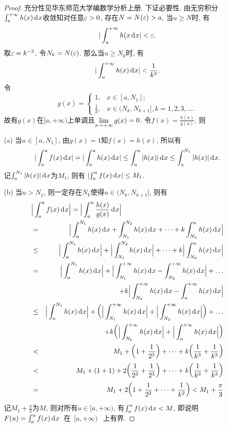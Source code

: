 \documentclass[a4paper,12pt,twoside]{ctexart}
\begin{document}
\begin{proof}
    充分性见华东师范大学编数学分析上册. 下证必要性.
    由无穷积分$\int_{a}^{+\infty}{h(x){\,\textup{d}}^{}x}$收敛知对任意$\varepsilon>0$, 存在$N=N(\varepsilon)>a$, 当$u\ge N$时, 有
        $$\vert\int_u^{+\infty}h(x{\,\textup{d}}^{}x\vert<\varepsilon.$$
    取$\varepsilon=k^{-3}$, 令$N_k=N(\varepsilon)$.  那么当$u\ge N_k$时, 有
        $$\vert\int_u^{+\infty}h(x){\,\textup{d}}^{}x\vert<\frac{1}{k^3}.$$
    令
$$
g(x)=\begin{cases}
    1,&x\in[a, N_1];\\
    \frac{1}{k},&x\in(N_k, N_{k+1}], k=1,2,3,\dots.
    \end{cases}
$$
故有$g(x)$在$[a, +\infty)$上单调且$\displaystyle\lim_{x\to+\infty}g(x)=0$. 令$f(x)=\frac{h(x)}{g(x)}$, 则

    (a) 当$u\in[a, N_1]$, 由$g(x)=1$知$f(x)=h(x)$, 所以有
    $$\vert\int_{a}^{u}{f(x){\,\textup{d}}^{}x}\vert=\vert\int_{a}^{u}{h(x){\,\textup{d}}^{}x}\vert \le\int_{a}^{u}\vert{h(x)}\vert{\,\textup{d}}^{}x\le\int_{a}^{N_1}\vert h(x)\vert{\,\textup{d}}^{}x.$$
    记$\int_{a}^{N_1}\vert h(x)\vert{\,\textup{d}}^{}x$为$ M_1$, 则有 ${\vert{\int_{a}^{u}{f(x){\,\textup{d}}^{}x}}\vert}\leq M_1$.

    (b) 当$u>N_1$, 则一定存在${N_k}$使得$u\in(N_k, N_{k+1}]$, 则有\setcolsep
\begin{eqnarray*}
\lefteqn{\Big\vert\int_a^uf(x)\dx\Big\vert
    =\Big\vert\int_{a}^{u}\frac{h(x)}{g(x)}\dx\Big\vert}\\
    &=&\Big\vert\int_{a}^{N_1}h(x)\dx+ \int_{N_1}^{N_2}h(x)\dx+\dots+k\int_{N_k}^uh(x)\dx\Big\vert\\
    &\le&\Big\vert\int_{a}^{N_1}h(x)\dx\Big\vert +\Big\vert\int_{N_1}^{N_2}h(x)\dx\Big\vert+\dots+ k\Big\vert\int_{N_k}^{u}h(x)\dx\Big\vert\\
    &=&\Big\vert\int_{a}^{N_1}h(x)\dx\Big\vert +\Big\vert\int_{N_1}^{+\infty}h(x)\dx- \int_{N_2}^{+\infty}h(x)\dx\Big\vert+\dots \\&&\quad+k\Big\vert\int_{N_k}^{+\infty}h(x)\dx -\int_{u}^{+\infty}h(x)\dx\Big\vert\\
    &\le&\Big\vert\int_{a}^{N_1}h(x)\dx\Big\vert +\bigg(\Big\vert\int_{N_1}^{+\infty}h(x)\dx\Big\vert +\Big\vert\int_{N_2}^{+\infty}h(x)\dx\Big\vert\bigg)+\dots
    \\ &&\quad+k\bigg(\Big\vert\int_{N_k}^{+\infty}h(x)\dx\Big\vert +\Big\vert\int_{u}^{+\infty}h(x)\dx\Big\vert\bigg)\\
    &<&M_1+\bigg(1+\frac1{2^3}\bigg)+\cdots+k\bigg(\frac1{k^3}+\frac1{k^3}\bigg)\\
    &<&M_1+(1+1)+2\bigg(\frac1{2^3}+\frac1{2^3}\bigg) +\dots+k\bigg(\frac1{k^3}+\frac1{k^3}\bigg)\\
    &=& M_1+2\bigg(1+\frac1{2^2}+\dots+\frac1{k^2}\bigg)< M_1+\frac\pi3
\end{eqnarray*}
记$M_1+\frac\pi3$为$M$, 则对所有$u\in[a, +\infty)$, 有$\int_a^uf(x){\,\textup{d}}^{}x<M$, 即说明~$F(u)=\int_{a}^{u}f(x){\,\textup{d}}^{}x$~在~$[a, +\infty)$~ 上有界.
\end{proof}
\end{document}
